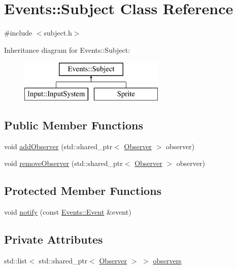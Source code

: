 \hypertarget{class_events_1_1_subject}{}\section{Events\+:\+:Subject Class Reference}
\label{class_events_1_1_subject}


{\ttfamily \#include $<$subject.\+h$>$}

Inheritance diagram for Events\+:\+:Subject\+:\begin{figure}[H]
\begin{center}
\leavevmode
\includegraphics[height=2.000000cm]{class_events_1_1_subject}
\end{center}
\end{figure}
\subsection*{Public Member Functions}
\begin{DoxyCompactItemize}
\item 
void \hyperlink{class_events_1_1_subject_a9cf441c596a14b74a293412530052a56}{add\+Observer} (std\+::shared\+\_\+ptr$<$ \hyperlink{class_events_1_1_observer}{Observer} $>$ observer)
\item 
void \hyperlink{class_events_1_1_subject_a7b1c766879ff3687012a7262d551da4f}{remove\+Observer} (std\+::shared\+\_\+ptr$<$ \hyperlink{class_events_1_1_observer}{Observer} $>$ observer)
\end{DoxyCompactItemize}
\subsection*{Protected Member Functions}
\begin{DoxyCompactItemize}
\item 
void \hyperlink{class_events_1_1_subject_a7a9db96975d15deb897c4a53d0ff0dd3}{notify} (const \hyperlink{class_events_1_1_event}{Events\+::\+Event} \&event)
\end{DoxyCompactItemize}
\subsection*{Private Attributes}
\begin{DoxyCompactItemize}
\item 
std\+::list$<$ std\+::shared\+\_\+ptr$<$ \hyperlink{class_events_1_1_observer}{Observer} $>$ $>$ \hyperlink{class_events_1_1_subject_ad3018a440e8f470384c8543412ed5c22}{observers}
\end{DoxyCompactItemize}


